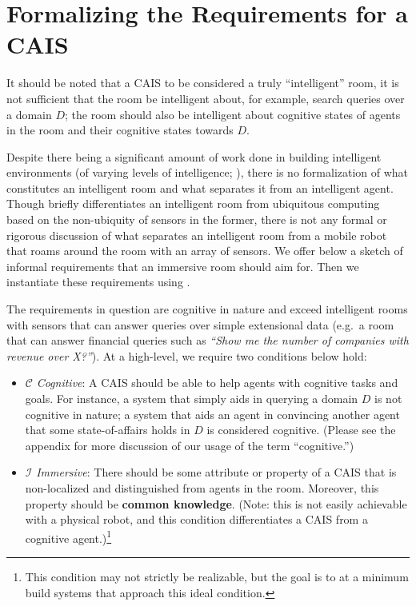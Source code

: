 \section{Formalizing the Requirements for a CAIS}

It should be noted that a CAIS to be considered a truly ``intelligent''
room, it is not sufficient that the room be intelligent about, for
example, search queries over a domain $D$; the room should also be
intelligent about cognitive states of agents in the room and their
cognitive states towards $D$.

Despite there being a significant amount of work done in building
intelligent environments (of varying levels of intelligence;
\citealp{coen1998design, brooks1997intelligent,chan2008review}), there
is no formalization of what constitutes an intelligent room and what
separates it from an intelligent agent.  Though \citep{coen1998design}
briefly differentiates an intelligent room from ubiquitous computing
based on the non-ubiquity of sensors in the former, there is not any
formal or rigorous discussion of what separates an intelligent room
from a mobile robot that roams around the room with an array of
sensors.  We offer below a sketch of informal requirements that an
immersive room should aim for.  Then we instantiate these requirements
using \DCEC.

The requirements in question are cognitive in nature and exceed
intelligent rooms with sensors that can answer queries over simple
extensional data (e.g.\ a room that can answer financial queries such
as \textit{``Show me the number of companies with revenue over X?''}).
At a high-level, we require two conditions below hold:

    \begin{itemize}
    \item $\mathcal{C}$ \emph{Cognitive}: A CAIS should be able to
      help agents with cognitive tasks and goals.  For instance, a
      system that simply aids in querying a domain $D$ is not
      cognitive in nature; a system that aids an agent in convincing
      another agent that some state-of-affairs holds in $D$ is
      considered cognitive. (Please see the appendix for more
      discussion of our usage of the term ``cognitive.'')
    \item $\mathcal{I}$ \emph{Immersive}:  There should
      be some attribute or property of a CAIS that is non-localized
      and distinguished from agents in the room.  Moreover, this
      property should be \textbf{common knowledge}.  (Note: this is
      not easily achievable with a physical robot, and this condition
      differentiates a CAIS from a cognitive
      agent.)\footnote{This condition may not strictly be realizable,
        but the goal is to at a minimum build systems that approach
        this ideal condition.}
    \end{itemize}


